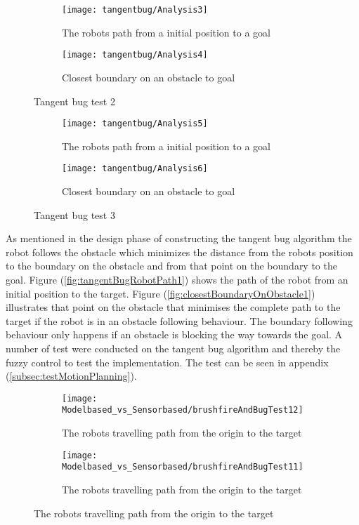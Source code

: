 \documentclass[../Head/Main.tex]{subfiles}
\begin{document}
\begin{figure}[H]
  \begin{subfigure}[b]{0.59\textwidth}
    \centering
    \texttt{[image: tangentbug/Analysis3]}
    \caption{The robots path from a initial position to a goal}
    \label{fig:tangentBugRobotPath2}
  \end{subfigure}
  \hfill
   \begin{subfigure}[b]{0.39\textwidth}
    \centering
    \texttt{[image: tangentbug/Analysis4]}
    \caption{Closest boundary on an obstacle to goal}
    \label{fig:closestBoundaryOnObstacle2}
  \end{subfigure}
  \caption{Tangent bug test 2}
  \end{figure}
  
  \begin{figure}[H]
  \begin{subfigure}[b]{0.59\textwidth}
    \centering
    \texttt{[image: tangentbug/Analysis5]}
    \caption{The robots path from a initial position to a goal}
    \label{fig:tangentBugRobotPath3}
  \end{subfigure}
  \hfill
   \begin{subfigure}[b]{0.39\textwidth}
    \centering
    \texttt{[image: tangentbug/Analysis6]}
    \caption{Closest boundary on an obstacle to goal}
    \label{fig:closestBoundaryOnObstacle3}
  \end{subfigure}
  \caption{Tangent bug test 3}
\end{figure}
  
As mentioned in the design phase of constructing the tangent bug algorithm the robot follows the obstacle which minimizes the distance from the robots position to the boundary on the obstacle and from that point on the boundary to the goal. Figure (\ref{fig:tangentBugRobotPath1}) shows the path of the robot from an initial position to the target. Figure (\ref{fig:closestBoundaryOnObstacle1}) illustrates that point on the obstacle that minimises the complete path to the target if the robot is in an obstacle following behaviour. The boundary following behaviour only happens if an obstacle is blocking the way towards the goal. A number of test were conducted on the tangent bug algorithm and thereby the fuzzy control to test the implementation. The test can be seen in appendix (\ref{subsec:testMotionPlanning}).   

\begin{figure}[H]
	\begin{subfigure}[b]{0.49\textwidth}
    	\centering
    	\texttt{[image: Modelbased\_vs\_Sensorbased/brushfireAndBugTest12]}
    	\caption{The robots travelling path from the origin to the target}
    	\label{fig:tangentBugAnalyseTest1}
  	\end{subfigure}
    \hfill
   	\begin{subfigure}[b]{0.49\textwidth}
    	\centering
    	\texttt{[image: Modelbased\_vs\_Sensorbased/brushfireAndBugTest11]}
    	\caption{The robots travelling path from the origin to the target}
    	\label{fig:tangentBugAnalyseTest2}
  	\end{subfigure}
\end{figure}
  
\end{document}
